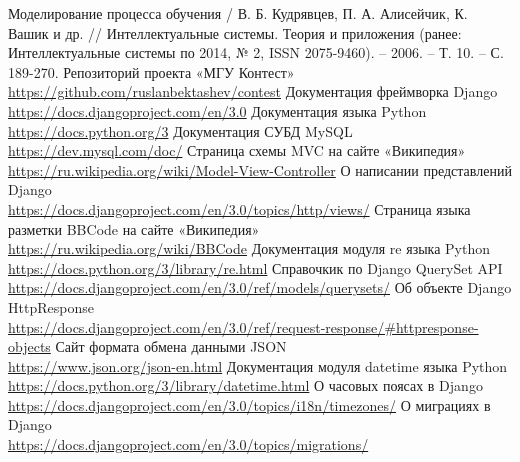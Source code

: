 \documentclass[12pt, a4paper, oneside]{article}
\begin{document}
\begin{thebibliography}{20}
    Моделирование процесса обучения / В. Б. Кудрявцев, П. А. Алисейчик, К. Вашик и др. // Интеллектуальные системы. Теория и приложения (ранее: Интеллектуальные системы по 2014, № 2, ISSN 2075-9460). – 2006. – Т. 10. – С. 189-270.
    Репозиторий проекта «МГУ Контест»\\
    \url{https://github.com/ruslanbektashev/contest}
    Документация фреймворка Django\\
    \url{https://docs.djangoproject.com/en/3.0}
    Документация языка Python\\
    \url{https://docs.python.org/3}
    Документация СУБД MySQL\\
    \url{https://dev.mysql.com/doc/}
    Страница схемы MVC на сайте «Википедия»\\
    \url{https://ru.wikipedia.org/wiki/Model-View-Controller}
    О написании представлений Django\\
    \url{https://docs.djangoproject.com/en/3.0/topics/http/views/}
    Страница языка разметки BBCode на сайте «Википедия»\\
    \url{https://ru.wikipedia.org/wiki/BBCode}
    Документация модуля re языка Python\\
    \url{https://docs.python.org/3/library/re.html}
    Справочкик по Django QuerySet API\\
    \url{https://docs.djangoproject.com/en/3.0/ref/models/querysets/}
    Об объекте Django HttpResponse\\
    \url{https://docs.djangoproject.com/en/3.0/ref/request-response/#httpresponse-objects}
    Сайт формата обмена данными JSON\\
    \url{https://www.json.org/json-en.html}
    Документация модуля datetime языка Python\\
    \url{https://docs.python.org/3/library/datetime.html}
    О часовых поясах в Django\\
    \url{https://docs.djangoproject.com/en/3.0/topics/i18n/timezones/}
    О миграциях в Django\\
    \url{https://docs.djangoproject.com/en/3.0/topics/migrations/}
\end{thebibliography}
\endgroup
\end{document}
